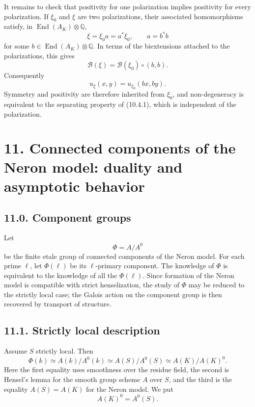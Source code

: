 \documentclass[11pt]{article}
\newcommand{\End}{\operatorname{End}}
\newcommand{\Q}{\mathbb Q}
\begin{document}
It remains to check that positivity for one polarization implies positivity for every polarization.  If \(\xi_0\) and \(\xi\) are two polarizations, their associated homomorphisms satisfy, in \(\End(A_K)\otimes\Q\),
\[
        \xi=\xi_0 a=a^*\xi_0,
        \qquad
        a=b^*b
\]
for some \(b\in\End(A_K)\otimes\Q\).  In terms of the biextensions attached to the polarizations, this gives
\begin{equation}\tag{10.5.5.1}
        \mathcal B(\xi)=\mathcal B(\xi_0)\circ(b,b).
\end{equation}
Consequently
\begin{equation}\tag{10.5.5.2}
        u_\xi(x,y)=u_{\xi_0}(b x,b y).
\end{equation}
Symmetry and positivity are therefore inherited from \(\xi_0\), and non-degeneracy is equivalent to the separating property of (10.4.1), which is independent of the polarization.

\section*{11. Connected components of the Neron model: duality and asymptotic behavior}

\subsection*{11.0. Component groups}
Let
\begin{equation}\tag{11.0.1}
        \Phi=A/A^0
\end{equation}
be the finite etale group of connected components of the Neron model.  For each prime \(\ell\), let \(\Phi(\ell)\) be its \(\ell\)-primary component.  The knowledge of \(\Phi\) is equivalent to the knowledge of all the \(\Phi(\ell)\).  Since formation of the Neron model is compatible with strict henselization, the study of \(\Phi\) may be reduced to the strictly local case; the Galois action on the component group is then recovered by transport of structure.

\subsection*{11.1. Strictly local description}
Assume \(S\) strictly local.  Then
\begin{equation}\tag{11.1.1}
        \Phi(k)\simeq A(k)/A^0(k)
        \simeq A(S)/A^0(S)
        \simeq A(K)/A(K)^0.
\end{equation}
Here the first equality uses smoothness over the residue field, the second is Hensel's lemma for the smooth group scheme \(A\) over \(S\), and the third is the equality \(A(S)=A(K)\) for the Neron model.  We put
\begin{equation}\tag{11.1.2}
        A(K)^0=A^0(S).
\end{equation}
\end{document}
